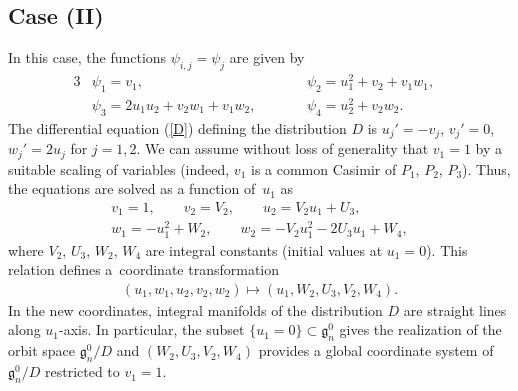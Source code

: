 \documentclass[10pt,a4paper]{amsart}
\numberwithin{equation}{section}
\begin{document}
\subsection{Case (II)}\label{section3.2}

In this case, the functions $\psi _{i,j} = \psi _j$ are given by
\begin{alignat*}{3}
& \psi _1 = v_1, \qquad && \psi _2 = u_1^2 + v_2 + v_1w_1, & \\
& \psi _3 = 2u_1u_2 + v_2w_1 + v_1w_2, \qquad && \psi _4 = u_2^2+v_2w_2.&
\end{alignat*}
The dif\/ferential equation (\ref{D}) def\/ining the distribution $D$ is $u_j' = -v_j$, $v_j' = 0$, $w_j' = 2u_j$ for $j=1,2$. We can assume without loss of generality that $v_1 = 1$ by a suitable scaling of variables (indeed, $v_1$ is a common Casimir of $P_1$, $P_2$, $P_3$). Thus, the equations are solved as a function of~$u_1$ as
\begin{gather*}
v_1 = 1,\qquad v_2 = V_2,\qquad u_2 = V_2u_1 + U_3,\\ w_1 = -u_1^2 + W_2,\qquad w_2 = -V_2u_1^2 - 2U_3u_1 + W_4,
\end{gather*}
where $V_2$, $U_3$, $W_2$, $W_4$ are integral constants (initial values at $u_1=0$). This relation def\/ines a~coordinate transformation
\begin{gather*}
(u_1, w_1, u_2, v_2, w_2) \mapsto (u_1, W_2, U_3, V_2, W_4).
\end{gather*}
In the new coordinates, integral manifolds of the distribution $D$ are straight lines along $u_1$-axis. In particular, the subset $\{ u_1 = 0\} \subset \mathfrak{g}^0_n$ gives the realization of the orbit space $\mathfrak{g}^0_n/D$ and $(W_2, U_3, V_2, W_4)$ provides a global coordinate system of $\mathfrak{g}^0_n/D$ restricted to $v_1 = 1$.
\end{document}
